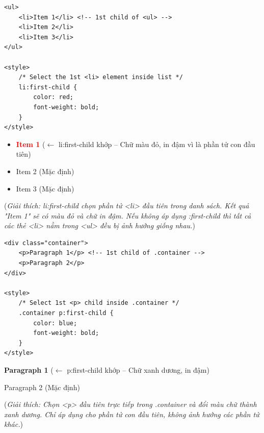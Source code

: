 \documentclass[11pt,oneside]{book}
\begin{document}
\begin{codeWindow}
\begin{lstlisting}[language=HTML5]
<ul>
    <li>Item 1</li> <!-- 1st child of <ul> -->
    <li>Item 2</li>
    <li>Item 3</li>
</ul>

<style>
    /* Select the 1st <li> element inside list */
    li:first-child {
        color: red;
        font-weight: bold;
    }
</style>
\end{lstlisting}
\end{codeWindow}

\begin{browserWindow}
\sffamily\small
\begin{itemize}[leftmargin=1.5em, itemsep=2pt, parsep=0pt]
    \item \textcolor{red}{\textbf{Item 1}} {\scriptsize\textcolor{gray!60}{($\leftarrow$ li:first-child khớp -- Chữ màu đỏ, in đậm vì là phần tử con đầu tiên)}}
    \item Item 2 {\scriptsize\textcolor{gray!60}{(Mặc định)}}
    \item Item 3 {\scriptsize\textcolor{gray!60}{(Mặc định)}}
\end{itemize}
\par\vspace{3pt}
{\scriptsize\textcolor{gray!60}{(\textit{Giải thích: li:first-child chọn phần tử <li> đầu tiên trong danh sách. Kết quả "Item 1" sẽ có màu đỏ và chữ in đậm. Nếu không áp dụng :first-child thì tất cả các thẻ <li> nằm trong <ul> đều bị ảnh hưởng giống nhau.})}}
\end{browserWindow}

\begin{codeWindow}
\begin{lstlisting}[language=HTML5]
<div class="container">
    <p>Paragraph 1</p> <!-- 1st child of .container -->
    <p>Paragraph 2</p>
</div>

<style>
    /* Select 1st <p> child inside .container */
    .container p:first-child {
        color: blue;
        font-weight: bold;
    }
</style>
\end{lstlisting}
\end{codeWindow}

\begin{browserWindow}
\sffamily\small
\textcolor{primaryBlue}{\textbf{Paragraph 1}} {\scriptsize\textcolor{gray!60}{($\leftarrow$ p:first-child khớp -- Chữ xanh dương, in đậm)}} \par\vspace{2pt}
Paragraph 2 {\scriptsize\textcolor{gray!60}{(Mặc định)}} \par\vspace{3pt}
{\scriptsize\textcolor{gray!60}{(\textit{Giải thích: Chọn <p> đầu tiên trực tiếp trong .container và đổi màu chữ thành xanh dương. Chỉ áp dụng cho phần tử con đầu tiên, không ảnh hưởng các phần tử khác.})}}
\end{browserWindow}
\end{document}
